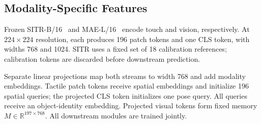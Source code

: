 \documentclass[letterpaper,10pt,conference]{ieeeconf}
\begin{document}


\subsection{Modality-Specific Features}
\label{sec:encoders}
Frozen SITR-B/16~\cite{gupta2025sitr} and MAE-L/16~\cite{he2022mae} encode touch and vision, respectively. At $224\times224$ resolution, each produces 196 patch tokens and one CLS token, with widths 768 and 1024. SITR uses a fixed set of 18 calibration references; calibration tokens are discarded before downstream prediction.

Separate linear projections map both streams to width 768 and add modality embeddings. Tactile patch tokens receive spatial embeddings and initialize 196 spatial queries; the projected CLS token initializes one pose query. All queries receive an object-identity embedding. Projected visual tokens form fixed memory $M\in\mathbb R^{197\times768}$. All downstream modules are trained jointly.
\end{document}

